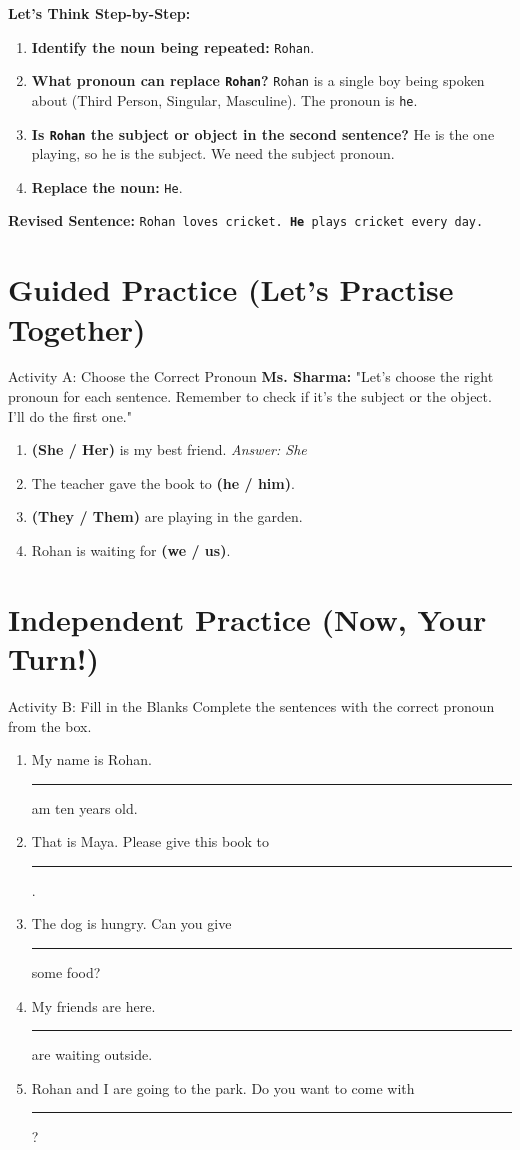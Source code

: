 \textbf{Let's Think Step-by-Step:}
\begin{enumerate}
    \item \textbf{Identify the noun being repeated:} \texttt{Rohan}.
    \item \textbf{What pronoun can replace \texttt{Rohan}?} \texttt{Rohan} is a single boy being spoken about (Third Person, Singular, Masculine). The pronoun is \texttt{he}.
    \item \textbf{Is \texttt{Rohan} the subject or object in the second sentence?} He is the one playing, so he is the subject. We need the subject pronoun.
    \item \textbf{Replace the noun:} \texttt{He}.
\end{enumerate}
\textbf{Revised Sentence:} \texttt{Rohan loves cricket. \textbf{He} plays cricket every day.}

\section{Guided Practice (Let's Practise Together)}
\begin{activitybox}{Activity A: Choose the Correct Pronoun}
\textbf{Ms. Sharma:} "Let's choose the right pronoun for each sentence. Remember to check if it's the subject or the object. I'll do the first one."
\begin{enumerate}
    \item \textbf{(She / Her)} is my best friend. \textit{Answer: She}
    \item The teacher gave the book to \textbf{(he / him)}.
    \item \textbf{(They / Them)} are playing in the garden.
    \item Rohan is waiting for \textbf{(we / us)}.
\end{enumerate}
\end{activitybox}

\section{Independent Practice (Now, Your Turn!)}
\begin{activitybox}{Activity B: Fill in the Blanks}
Complete the sentences with the correct pronoun from the box.


\begin{enumerate}
    \item My name is Rohan. \rule{2cm}{0.4pt} am ten years old.
    \item That is Maya. Please give this book to \rule{2cm}{0.4pt}.
    \item The dog is hungry. Can you give \rule{2cm}{0.4pt} some food?
    \item My friends are here. \rule{2cm}{0.4pt} are waiting outside.
    \item Rohan and I are going to the park. Do you want to come with \rule{2cm}{0.4pt}?
\end{enumerate}
\end{activitybox}

